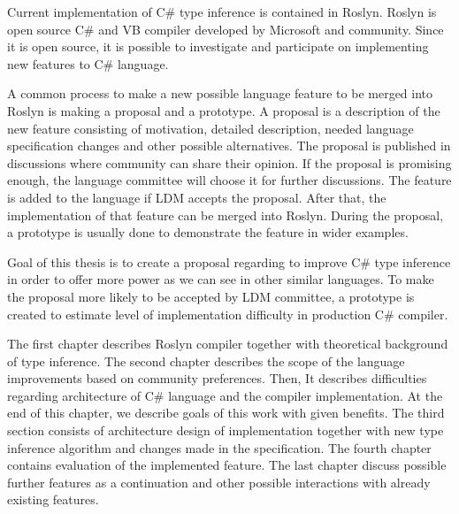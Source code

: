 Current implementation of C\# type inference is contained in Roslyn.
Roslyn is open source C\# and VB compiler developed by Microsoft and community.
Since it is open source, it is possible to investigate and participate on implementing new features to C\# language.

A common process to make a new possible language feature to be merged into Roslyn is making a proposal and a prototype.
A proposal is a description of the new feature consisting of motivation, detailed description, needed language specification changes and other possible alternatives.
The proposal is published in discussions where community can share their opinion.
If the proposal is promising enough, the language committee will choose it for further discussions.
The feature is added to the language if LDM accepts the proposal.
After that, the implementation of that feature can be merged into Roslyn.
During the proposal, a prototype is usually done to demonstrate the feature in wider examples.

Goal of this thesis is to create a proposal regarding to improve C\# type inference in order to offer more power as we can see in other similar languages.
To make the proposal more likely to be accepted by LDM committee, a prototype is created to estimate level of implementation difficulty in production C\# compiler.

The first chapter describes Roslyn compiler together with theoretical background of type inference.
The second chapter describes the scope of the language improvements based on community preferences.
Then, It describes difficulties regarding architecture of C\# language and the compiler implementation.
At the end of this chapter, we describe goals of this work with given benefits.
The third section consists of architecture design of implementation together with new type inference algorithm and changes made in the specification.
The fourth chapter contains evaluation of the implemented feature.
The last chapter discuss possible further features as a continuation and other possible interactions with already existing features.
